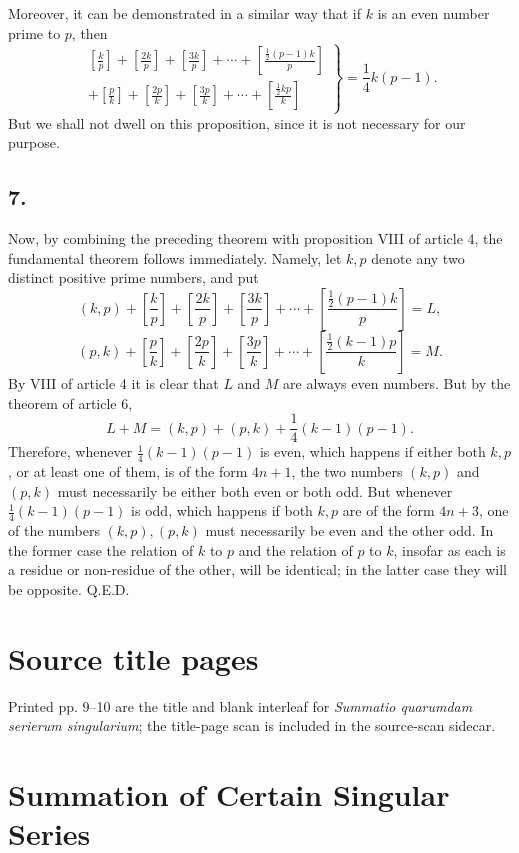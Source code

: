 \documentclass[12pt]{article}
\begin{document}
Moreover, it can be demonstrated in a similar way that if $k$ is an even number prime to $p$, then
\[
\left.
\begin{array}{l}
\left[\frac{k}{p}\right]+\left[\frac{2k}{p}\right]+\left[\frac{3k}{p}\right]+\cdots+\left[\frac{\frac12(p-1)k}{p}\right]\\
+\left[\frac{p}{k}\right]+\left[\frac{2p}{k}\right]+\left[\frac{3p}{k}\right]+\cdots+\left[\frac{\frac12 kp}{k}\right]
\end{array}
\right\}
=\frac14k(p-1).
\]
But we shall not dwell on this proposition, since it is not necessary for our purpose.

\subsection*{7.}

Now, by combining the preceding theorem with proposition VIII of article 4, the fundamental theorem follows immediately. Namely, let $k,p$ denote any two distinct positive prime numbers, and put
\[
(k,p)+\left[\frac{k}{p}\right]+\left[\frac{2k}{p}\right]+\left[\frac{3k}{p}\right]+\cdots+\left[\frac{\frac12(p-1)k}{p}\right]=L,
\]
\[
(p,k)+\left[\frac{p}{k}\right]+\left[\frac{2p}{k}\right]+\left[\frac{3p}{k}\right]+\cdots+\left[\frac{\frac12(k-1)p}{k}\right]=M.
\]
By VIII of article 4 it is clear that $L$ and $M$ are always even numbers. But by the theorem of article 6,
\[
L+M=(k,p)+(p,k)+\frac14(k-1)(p-1).
\]
Therefore, whenever $\frac14(k-1)(p-1)$ is even, which happens if either both $k,p$, or at least one of them, is of the form $4n+1$, the two numbers $(k,p)$ and $(p,k)$ must necessarily be either both even or both odd. But whenever $\frac14(k-1)(p-1)$ is odd, which happens if both $k,p$ are of the form $4n+3$, one of the numbers $(k,p),(p,k)$ must necessarily be even and the other odd. In the former case the relation of $k$ to $p$ and the relation of $p$ to $k$, insofar as each is a residue or non-residue of the other, will be identical; in the latter case they will be opposite. Q.E.D.

\clearpage
\section*{Source title pages}
Printed pp. 9--10 are the title and blank interleaf for \emph{Summatio quarumdam serierum singularium}; the title-page scan is included in the source-scan sidecar.


\section*{Summation of Certain Singular Series}
\end{document}
